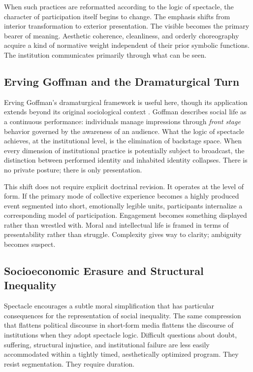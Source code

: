 \documentclass[11pt]{article}
\begin{document}
When such practices are reformatted according to the logic of spectacle, the character of participation itself begins to change. The emphasis shifts from interior transformation to exterior presentation. The visible becomes the primary bearer of meaning. Aesthetic coherence, cleanliness, and orderly choreography acquire a kind of normative weight independent of their prior symbolic functions. The institution communicates primarily through what can be seen.

\subsection{Erving Goffman and the Dramaturgical Turn}

Erving Goffman's dramaturgical framework is useful here, though its application extends beyond its original sociological context \citep{Goffman1959}. Goffman describes social life as a continuous performance: individuals manage impressions through \emph{front stage} behavior governed by the awareness of an audience. What the logic of spectacle achieves, at the institutional level, is the elimination of backstage space. When every dimension of institutional practice is potentially subject to broadcast, the distinction between performed identity and inhabited identity collapses. There is no private posture; there is only presentation.

This shift does not require explicit doctrinal revision. It operates at the level of form. If the primary mode of collective experience becomes a highly produced event segmented into short, emotionally legible units, participants internalize a corresponding model of participation. Engagement becomes something displayed rather than wrestled with. Moral and intellectual life is framed in terms of presentability rather than struggle. Complexity gives way to clarity; ambiguity becomes suspect.

\subsection{Socioeconomic Erasure and Structural Inequality}

Spectacle encourages a subtle moral simplification that has particular consequences for the representation of social inequality. The same compression that flattens political discourse in short-form media flattens the discourse of institutions when they adopt spectacle logic. Difficult questions about doubt, suffering, structural injustice, and institutional failure are less easily accommodated within a tightly timed, aesthetically optimized program. They resist segmentation. They require duration.
\end{document}
